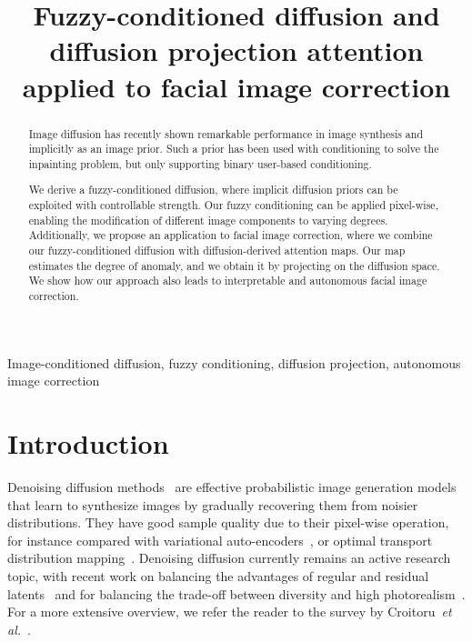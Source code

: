 \documentclass{article}
\title{Fuzzy-conditioned diffusion and diffusion projection attention applied to facial image correction}
\begin{document}
\maketitle
\begin{abstract}
Image diffusion has recently shown remarkable performance in image synthesis and implicitly as an image prior. Such a prior has been used with conditioning to solve the inpainting problem, but only supporting binary user-based conditioning. 

We derive a fuzzy-conditioned diffusion, where implicit diffusion priors can be exploited with controllable strength. Our fuzzy conditioning can be applied pixel-wise, enabling the modification of different image components to varying degrees. Additionally, we propose an application to facial image correction, where we combine our fuzzy-conditioned diffusion with diffusion-derived attention maps. Our map estimates the degree of anomaly, and we obtain it by projecting on the diffusion space. We show how our approach also leads to interpretable and autonomous facial image correction.
\end{abstract}

\begin{keywords}
Image-conditioned diffusion, fuzzy conditioning, diffusion projection, autonomous image correction
\end{keywords}

\noindent\let\thefootnote\relax{}


\section{Introduction} \label{sec:intro}
Denoising diffusion methods~\cite{sohl2015deep} are effective probabilistic image generation models~\cite{ho2020denoising} that learn to synthesize images by gradually recovering them from noisier distributions. They have good sample quality due to their pixel-wise operation, for instance compared with variational auto-encoders~\cite{pandey2021vaes,pandey2022diffusevae}, or optimal transport distribution mapping~\cite{daniels2021score}. Denoising diffusion currently remains an active research topic, with recent work on balancing the advantages of regular and residual latents~\cite{benny2022dynamic} and for balancing the trade-off between diversity and high photorealism~\cite{sehwag2022generating}. For a more extensive overview, we refer the reader to the survey by Croitoru~\textit{et al.}~\cite{croitoru2022diffusion}. 
\end{document}
